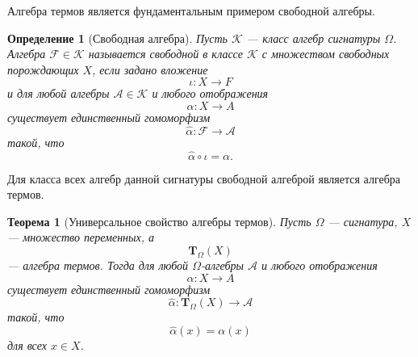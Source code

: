 \documentclass[12pt,a4paper]{article}
\newtheorem{definition}{Определение}
\newtheorem{theorem}{Теорема}
\begin{document}
Алгебра термов является фундаментальным примером свободной алгебры.

\begin{definition}[Свободная алгебра]
Пусть $\mathcal K$ --- класс алгебр сигнатуры $\Omega$. Алгебра $\mathcal F\in\mathcal K$ называется \emph{свободной в классе $\mathcal K$ с множеством свободных порождающих $X$}, если задано вложение
\[
\iota\colon X\to F
\]
и для любой алгебры $\mathcal A\in\mathcal K$ и любого отображения
\[
\alpha\colon X\to A
\]
существует единственный гомоморфизм
\[
\widehat{\alpha}\colon \mathcal F\to \mathcal A
\]
такой, что
\[
\widehat{\alpha}\circ\iota=\alpha.
\]
\end{definition}

Для класса всех алгебр данной сигнатуры свободной алгеброй является алгебра термов.

\begin{theorem}[Универсальное свойство алгебры термов]
Пусть $\Omega$ --- сигнатура, $X$ --- множество переменных, а
\[
\mathbf T_\Omega(X)
\]
--- алгебра термов. Тогда для любой $\Omega$-алгебры $\mathcal A$ и любого отображения
\[
\alpha\colon X\to A
\]
существует единственный гомоморфизм
\[
\widehat{\alpha}\colon \mathbf T_\Omega(X)\to \mathcal A
\]
такой, что
\[
\widehat{\alpha}(x)=\alpha(x)
\]
для всех $x\in X$.
\end{theorem}
\end{document}
